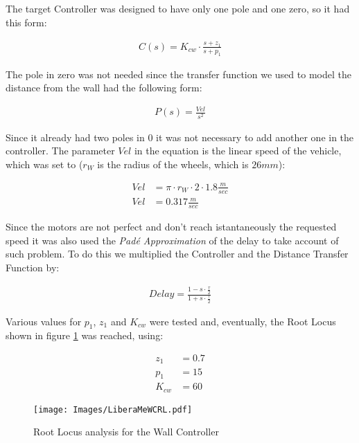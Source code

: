   The target Controller was designed to have only one pole and one zero, so
  it had this form:

  \begin{align}
    C(s) = K_{cw} \cdot \frac{s + z_1}{s + p_1}
  \end{align}

  The pole in zero was not needed since the transfer function we used to
  model the distance from the wall had the following form:

  \begin{align}\label{eqn:DistanceModel}
    P(s) = \frac{Vel}{s^2}
  \end{align}

  Since it already had two poles in $0$ it was not necessary to add
  another one in the controller. The parameter $Vel$ in the equation is the
  linear speed of the vehicle, which was set to ($r_W$ is the radius of the
  wheels, which is $26 mm$):

  \begin{align}
    Vel &= \pi \cdot r_W \cdot 2 \cdot 1.8 \frac{m}{sec} \\
    Vel &= 0.317 \frac{m}{sec}
  \end{align}

  Since the motors are not perfect and don't reach istantaneously the
  requested speed it was also used the \emph{Padé Approximation} of the
  delay to take account of such problem. To do this we multiplied the
  Controller and the Distance Transfer Function by:

  \begin{align}
    Delay = \frac{1 - s \cdot \frac{\tau}{2}}{1 + s \cdot \frac{\tau}{2}}
  \end{align}

  Various values for $p_1$, $z_1$ and $K_{cw}$ were tested and, eventually,
  the Root Locus shown in figure \ref{img:LiberaMeWCRL} was reached, using:

  \begin{align}
    z_1 &= 0.7 \\
    p_1 &= 15 \\
    K_{cw} &= 60
  \end{align}

  \begin{figure}[h!]
    \centering
    \texttt{[image: Images/LiberaMeWCRL.pdf]}
    \caption{Root Locus analysis for the Wall Controller \label{img:LiberaMeWCRL}}
  \end{figure}
  
